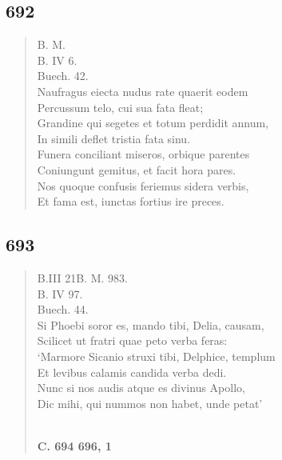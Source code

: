 \documentclass[11pt, a4paper]{report}
\begin{document}
            \subsection*{692}
      \begin{verse}
      B. M. \\ B. IV 6. \\ Buech. 42. \\ Naufragus eiecta nudus rate quaerit eodem \\ Percussum telo, cui sua fata fleat; \\ Grandine qui segetes et totum perdidit annum, \\ In simili deflet tristia fata sinu. \\ Funera conciliant miseros, orbique parentes \\ Coniungunt gemitus, et facit hora pares. \\ Nos quoque confusis feriemus sidera verbis, \\ Et fama est, iunctas fortius ire preces. \\ 
      \end{verse}
  
            \subsection*{693}
      \begin{verse}
      B.III 21B. M. 983. \\ B. IV 97. \\ Buech. 44. \\ Si Phoebi soror es, mando tibi, Delia, causam, \\ Scilicet ut fratri quae peto verba feras: \\ ‘Marmore Sicanio struxi tibi, Delphice, templum \\ Et levibus calamis candida verba dedi. \\ Nunc si nos audis atque es divinus Apollo, \\ Dic mihi, qui nummos non habet, unde petat’ \\ 
        ﻿\pagebreak 
     \marginpar{[169]} \begin{center} \textbf{C. 694 696, 1} \end{center}
      \end{verse}
  
\end{document}
